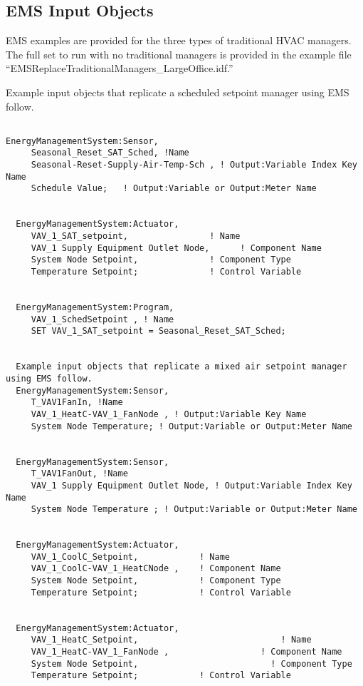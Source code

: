\subsection{EMS Input Objects}\label{ems-input-objects-004}

EMS examples are provided for the three types of traditional HVAC managers. The full set to run with no traditional managers is provided in the example file ``EMSReplaceTraditionalManagers\_LargeOffice.idf.''

Example input objects that replicate a scheduled setpoint manager using EMS follow.

\begin{lstlisting}

EnergyManagementSystem:Sensor,
     Seasonal_Reset_SAT_Sched, !Name
     Seasonal-Reset-Supply-Air-Temp-Sch , ! Output:Variable Index Key Name
     Schedule Value;   ! Output:Variable or Output:Meter Name


  EnergyManagementSystem:Actuator,
     VAV_1_SAT_setpoint,                ! Name
     VAV_1 Supply Equipment Outlet Node,      ! Component Name
     System Node Setpoint,              ! Component Type
     Temperature Setpoint;              ! Control Variable


  EnergyManagementSystem:Program,
     VAV_1_SchedSetpoint , ! Name
     SET VAV_1_SAT_setpoint = Seasonal_Reset_SAT_Sched;


  Example input objects that replicate a mixed air setpoint manager using EMS follow.
  EnergyManagementSystem:Sensor,
     T_VAV1FanIn, !Name
     VAV_1_HeatC-VAV_1_FanNode , ! Output:Variable Key Name
     System Node Temperature; ! Output:Variable or Output:Meter Name


  EnergyManagementSystem:Sensor,
     T_VAV1FanOut, !Name
     VAV_1 Supply Equipment Outlet Node, ! Output:Variable Index Key Name
     System Node Temperature ; ! Output:Variable or Output:Meter Name


  EnergyManagementSystem:Actuator,
     VAV_1_CoolC_Setpoint,            ! Name
     VAV_1_CoolC-VAV_1_HeatCNode ,    ! Component Name
     System Node Setpoint,            ! Component Type
     Temperature Setpoint;            ! Control Variable


  EnergyManagementSystem:Actuator,
     VAV_1_HeatC_Setpoint,                            ! Name
     VAV_1_HeatC-VAV_1_FanNode ,                  ! Component Name
     System Node Setpoint,                          ! Component Type
     Temperature Setpoint;            ! Control Variable



\end{lstlisting}
